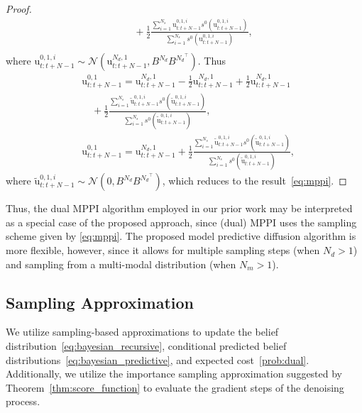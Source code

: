 \documentclass[letterpaper, 10 pt, conference]{IEEEconf}
\begin{document}
\begin{proof}
\begin{align*}
        & \quad + \frac{1}{2} \frac{\sum_{i=1}^{N_s} \mathrm{u}^{0, 1, i}_{t:t+N-1} s^{0}(\mathrm{u}^{0, 1, i}_{t:t+N-1})} {\sum_{i=1}^{N_s} s^{0}(\mathrm{u}^{0, 1, i}_{t:t+N-1})}, \\
    \end{align*}
    where $\mathrm{u}^{0, 1, i}_{t:t+N-1} \sim \mathcal{N}(\mathrm{u}_{t:t+N-1}^{N_d, 1}, B^{N_d} B^{{N_d}^{\top}})$.
    Thus 
    \begin{align*}
        &\mathrm{u}^{0, 1}_{t:t+N-1} = \mathrm{u}^{N_d, 1}_{t:t+N-1}  - \frac{1}{2} \mathrm{u}^{N_d, 1}_{t:t+N-1} + \frac{1}{2}  \mathrm{u}_{t:t+N-1}^{N_d, 1} \nonumber\\
        & \quad + \frac{1}{2} \frac{\sum_{i=1}^{N_s} \mathrm{\tilde{u}}^{0, 1, i}_{t:t+N-1} s^{0}(\mathrm{\tilde{u}}^{0, 1, i}_{t:t+N-1})} {\sum_{i=1}^{N_s} s^{0}(\mathrm{\tilde{u}}^{0, 1, i}_{t:t+N-1})}, \\
        &\mathrm{u}^{0, 1}_{t:t+N-1} = \mathrm{u}^{N_d, 1}_{t:t+N-1} + \frac{1}{2} \frac{\sum_{i=1}^{N_s} \mathrm{\tilde{u}}^{0, 1, i}_{t:t+N-1} s^{0}(\mathrm{\tilde{u}}^{0, 1, i}_{t:t+N-1})} {\sum_{i=1}^{N_s} s^{0}(\mathrm{\tilde{u}}^{0, 1, i}_{t:t+N-1})},
    \end{align*}
    where $\mathrm{\tilde{u}}^{0, 1, i}_{t:t+N-1} \sim \mathcal{N}(0, B^{N_d} B^{{N_d}^{\top}})$,
    which reduces to the result~\eqref{eq:mppi}.
\end{proof}
Thus, the dual MPPI algorithm employed in our prior work \cite{knaup2024active} may be interpreted as a special case of the proposed approach, since (dual) MPPI uses the sampling scheme given by \eqref{eq:mppi}. 
The proposed model predictive diffusion algorithm is more flexible, however, since it allows for multiple sampling steps (when $N_{d} > 1$) and sampling from a multi-modal distribution (when $N_m > 1$).

\subsection{Sampling Approximation} \label{sec:proposed_sampling_approximation}

We utilize sampling-based approximations to update the belief distribution~\eqref{eq:bayesian_recursive}, conditional predicted belief distributions~\eqref{eq:bayesian_predictive}, and expected cost~\eqref{prob:dual}. 
Additionally, we utilize the importance sampling approximation suggested by Theorem~\ref{thm:score_function} to evaluate the gradient steps of the denoising process.
\end{document}
